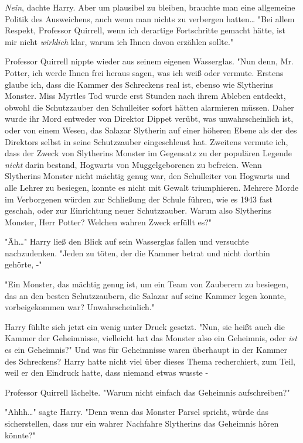 {\emph{Nein}, dachte Harry. Aber um plausibel zu bleiben, brauchte man eine allgemeine Politik des Ausweichens, auch wenn man nichts zu verbergen hatten… "Bei allem Respekt, Professor Quirrell, wenn ich derartige Fortschritte gemacht hätte, ist mir nicht \emph{wirklich} klar, warum ich Ihnen davon erzählen sollte."

Professor Quirrell nippte wieder aus seinem eigenen Wasserglas. "Nun denn, Mr. Potter, ich werde Ihnen frei heraus sagen, was ich weiß oder vermute. Erstens glaube ich, dass die Kammer des Schreckens real ist, ebenso wie Slytherins Monster. Miss Myrtles Tod wurde erst Stunden nach ihrem Ableben entdeckt, obwohl die Schutzzauber den Schulleiter sofort hätten alarmieren müssen. Daher wurde ihr Mord entweder von Direktor Dippet verübt, was unwahrscheinlich ist, oder von einem Wesen, das Salazar Slytherin auf einer höheren Ebene als der des Direktors selbst in seine Schutzzauber eingeschleust hat. Zweitens vermute ich, dass der Zweck von Slytherins Monster im Gegensatz zu der populären Legende \emph{nicht} darin bestand, Hogwarts von Muggelgeborenen zu befreien. Wenn Slytherins Monster nicht mächtig genug war, den Schulleiter von Hogwarts und alle Lehrer zu besiegen, konnte es nicht mit Gewalt triumphieren. Mehrere Morde im Verborgenen würden zur Schließung der Schule führen, wie es 1943 fast geschah, oder zur Einrichtung neuer Schutzzauber. Warum also Slytherins Monster, Herr Potter? Welchen wahren Zweck erfüllt es?"

"Äh…" Harry ließ den Blick auf sein Wasserglas fallen und versuchte nachzudenken. "Jeden zu töten, der die Kammer betrat und nicht dorthin gehörte, -"

"Ein Monster, das mächtig genug ist, um ein Team von Zauberern zu besiegen, das an den besten Schutzzaubern, die Salazar auf seine Kammer legen konnte, vorbeigekommen war? Unwahrscheinlich."

Harry fühlte sich jetzt ein wenig unter Druck gesetzt. "Nun, sie heißt auch die Kammer der Geheimnisse, vielleicht hat das Monster also ein Geheimnis, oder \emph{ist} es ein Geheimnis?" Und was für Geheimnisse waren überhaupt in der Kammer des Schreckens? Harry hatte nicht viel über dieses Thema recherchiert, zum Teil, weil er den Eindruck hatte, dass niemand etwas wusste -

Professor Quirrell lächelte. "Warum nicht einfach das Geheimnis aufschreiben?"

"Ahhh…" sagte Harry. "Denn wenn das Monster Parsel spricht, würde das sicherstellen, dass nur ein wahrer Nachfahre Slytherins das Geheimnis hören könnte?"

}
